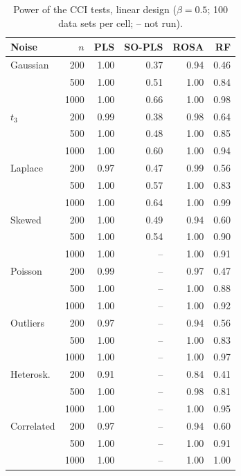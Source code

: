 \documentclass[10pt,leqno]{amsart}
\begin{document}
\begin{table}[H]
\caption{Power of the CCI tests, linear design ($\beta=0.5$; 100 data sets per cell; -- not run).}
\label{tab:cci-power}
\footnotesize
\begin{tabular}{lrrrrr}
\toprule
Noise & $n$ & PLS & SO-PLS & ROSA & RF \\
\midrule
Gaussian & 200 & 1.00 & 0.37 & 0.94 & 0.46 \\
 & 500 & 1.00 & 0.51 & 1.00 & 0.84 \\
 & 1000 & 1.00 & 0.66 & 1.00 & 0.98 \\
\addlinespace[1pt]
$t_3$ & 200 & 0.99 & 0.38 & 0.98 & 0.64 \\
 & 500 & 1.00 & 0.48 & 1.00 & 0.85 \\
 & 1000 & 1.00 & 0.60 & 1.00 & 0.94 \\
\addlinespace[1pt]
Laplace & 200 & 0.97 & 0.47 & 0.99 & 0.56 \\
 & 500 & 1.00 & 0.57 & 1.00 & 0.83 \\
 & 1000 & 1.00 & 0.64 & 1.00 & 0.99 \\
\addlinespace[1pt]
Skewed & 200 & 1.00 & 0.49 & 0.94 & 0.60 \\
 & 500 & 1.00 & 0.54 & 1.00 & 0.90 \\
 & 1000 & 1.00 & -- & 1.00 & 0.91 \\
\addlinespace[1pt]
Poisson & 200 & 0.99 & -- & 0.97 & 0.47 \\
 & 500 & 1.00 & -- & 1.00 & 0.88 \\
 & 1000 & 1.00 & -- & 1.00 & 0.92 \\
\addlinespace[1pt]
Outliers & 200 & 0.97 & -- & 0.94 & 0.56 \\
 & 500 & 1.00 & -- & 1.00 & 0.83 \\
 & 1000 & 1.00 & -- & 1.00 & 0.97 \\
\addlinespace[1pt]
Heterosk. & 200 & 0.91 & -- & 0.84 & 0.41 \\
 & 500 & 1.00 & -- & 0.98 & 0.81 \\
 & 1000 & 1.00 & -- & 1.00 & 0.95 \\
\addlinespace[1pt]
Correlated & 200 & 0.97 & -- & 0.94 & 0.60 \\
 & 500 & 1.00 & -- & 1.00 & 0.91 \\
 & 1000 & 1.00 & -- & 1.00 & 1.00 \\
\bottomrule
\end{tabular}
\end{table}
\end{document}
